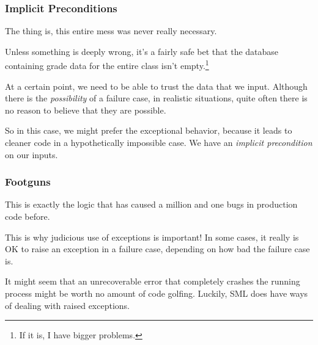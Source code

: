 \documentclass[aspectratio=169, handout]{beamer}
\begin{document}
\begin{frame}[fragile]
  \frametitle{Implicit Preconditions}

  The thing is, this entire mess was never really necessary.

  \pause
  \vspace{\fill}

  Unless something is deeply wrong, it's a fairly safe bet that
  the database containing grade data for the entire class
  isn't empty.\footnote{
    If it is, I have bigger problems.
  }

  \pause
  \vspace{\fill}

  At a certain point, we need to be able to trust the data that we input.
  Although there is the \textit{possibility} of a failure case, in realistic
  situations, quite often there is no reason to believe that they are possible.

  \pause
  \vspace{\fill}

  So in this case, we might prefer the exceptional behavior, because it leads
  to cleaner code in a hypothetically impossible case. We have an
  \textit{implicit precondition} on our inputs.
\end{frame}

\begin{frame}[fragile]
  \frametitle{Footguns}

  This is exactly the logic that has caused a million and one bugs in production
  code before.

  \pause
  \vspace{\fill}

  This is why judicious use of exceptions is important! In some cases, it really
  is OK to raise an exception in a failure case, depending on how bad the
  failure case is.

  \pause
  \vspace{\fill}

  It might seem that an unrecoverable error that completely crashes the
  running process might be worth no amount of code golfing. Luckily,
  SML does have ways of dealing with raised exceptions.
\end{frame}

\end{document}
